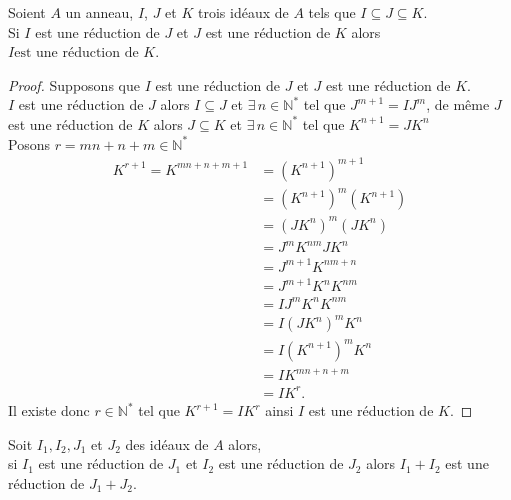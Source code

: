 \begin{maproposition}
	Soient $A$ un anneau, $I$, $J$ et $K$ trois id\'eaux de $A$ tels que 
	$I \subseteq J \subseteq K $.\\ Si $I$ est une réduction de $J$ et $J$ est une réduction de $K$ alors $ I \text{est une réduction de }  K $.
\end{maproposition}
\begin{proof}
	Supposons que $I$ est une réduction de $J$ et $J$ est une réduction de $K$.\\
	$I$ est une réduction de $J$ alors $I \subseteq J$ et $\exists \, n\in \mathbb{N}^{*}$ tel que $J^{m+1} = IJ^{m}$, de même $J$ est une réduction de $K$ alors $J \subseteq K$ et $\exists \, n\in \mathbb{N}^{*}$ tel que $K^{n+1} = JK^{n}$\\
	Posons $r = mn+n+m \in \mathbb{N}^{*}$
	\begin{align*}
		K^{r+1} = K^{mn+n+m+1}& = (K^{n+1})^{m+1}\\
		& = (K^{n+1})^{m}(K^{n+1})\\
		& = (JK^{n})^{m}(JK^{n})\\
		& = J^{m}K^{nm}JK^{n}\\
		& = J^{m+1}K^{nm+n}\\
		& = J^{m+1}K^{n}K^{nm}\\
		& = IJ^{m}K^{n}K^{nm}\\
		& = I(JK^{n})^{m}K^{n}\\
		& = I(K^{n+1})^{m}K^{n}\\
		& = IK^{mn+n+m}  \\
		& = IK^r.          
	\end{align*}
	Il existe donc $r\in \mathbb{N}^{*}$ tel que $K^{r+1} = IK^{r}$ ainsi $I$ est une réduction de $K$.
\end{proof}
\begin{monlemme}
	Soit $I_1, I_2, J_1$ et $J_2$ des idéaux de $A$ alors, \\ si $I_1$ est  une réduction de $J_1$ et $I_2$ est une réduction de $J_2$ alors $I_1+I_2$ est une réduction de $J_1+J_2$.
\end{monlemme}
